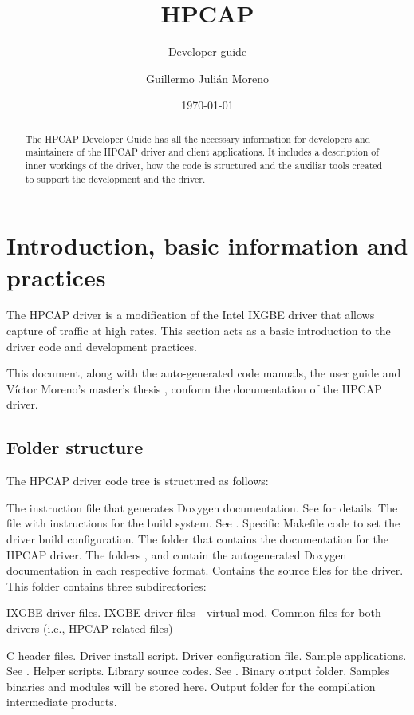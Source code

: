 \documentclass[oneside]{hpman}
\title{HPCAP}
\subtitle{Developer guide}
\author{Guillermo Juli\'an Moreno}
\date{\today}
\begin{document}
\begin{abstract}
The HPCAP Developer Guide has all the necessary information for developers and maintainers of the HPCAP driver and client applications. It includes a description of inner workings of the driver, how the code is structured and the auxiliar tools created to support the development and the driver.
\end{abstract}
\maketitle

\tableofcontents
\newpage

\chapter{Introduction, basic information and practices}

The HPCAP driver is a modification of the Intel IXGBE driver that allows capture of traffic at high rates. This section acts as a basic introduction to the driver code and development practices.

This document, along with the auto-generated code manuals, the user guide and V\'ictor Moreno's master's thesis \cite{MorenoTFM2012}, conform the documentation of the HPCAP driver.

\section{Folder structure}
\label{sec:dirs}

The HPCAP driver code tree is structured as follows:

\begin{itemize}
 The instruction file that generates Doxygen documentation. See  for details.
 The file with instructions for the build system. See .
 Specific Makefile code to set the driver build configuration.
 The folder that contains the documentation for the HPCAP driver. The folders ,  and  contain the autogenerated Doxygen documentation in each respective format.
 Contains the source files for the driver. This folder contains three subdirectories:
\begin{itemize}
 IXGBE driver files.
 IXGBE driver files - virtual mod.
 Common files for both drivers (i.e., HPCAP-related files)
\end{itemize}
 C header files.
 Driver install script.
 Driver configuration file.
 Sample applications. See .
 Helper scripts.
 Library source codes. See .
 Binary output folder. Samples binaries and modules will be stored here.
 Output folder for the compilation intermediate products.
\end{itemize}
\end{document}
